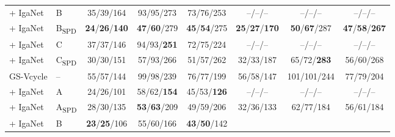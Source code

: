 \documentclass{article}
\theoremstyle{plain}
\numberwithin{equation}{section}
\begin{document}
\begin{table}[!ht]
\begin{tabular}{llcccccc}
        + IgaNet       & B                   & 35/39/164                           & 93/95/273                   & 73/76/253                            
                                             & --/--/--                            & --/--/--                    & --/--/--                             \\
        + IgaNet       & B\textsubscript{SPD}& \textbf{24}/\textbf{26}/\textbf{140}& \textbf{47}/\textbf{60}/279 & \textbf{45}/\textbf{54}/275                            
                                             & \textbf{25}/\textbf{27}/\textbf{170}& \textbf{50}/\textbf{67}/287          & \textbf{47}/\textbf{58}/\textbf{267}           \\
        + IgaNet       & C                   & 37/37/146                           & 94/93/\textbf{251}          & 72/75/224                            
                                             & --/--/--                            & --/--/--                    & --/--/--                             \\
        + IgaNet       & C\textsubscript{SPD}& 30/30/151                           & 57/93/266                   & 51/57/262                            
                                             & 32/33/187                           & 65/72/\textbf{283}          & 56/60/268                             \\
        \midrule
        GS-Vcycle      & --                  & 55/57/144                           & 99/98/239                   & 76/77/199                           
                                             & 56/58/147                           & 101/101/244                 & 77/79/204                             \\
        + IgaNet       & A                   & 24/26/101                           & 58/62/\textbf{154}          & 45/53/\textbf{126}                            
                                             & --/--/--                            & --/--/--                    & --/--/--                             \\
        + IgaNet       & A\textsubscript{SPD}& 28/30/135                           & \textbf{53}/\textbf{63}/209 & 49/59/206                            
                                             & 32/36/133                           & 62/77/184                   & 56/61/184                             \\
        + IgaNet       & B                   & \textbf{23}/\textbf{25}/106         & 55/60/166                   & \textbf{43}/\textbf{50}/142

\end{tabular}
\end{table}
\end{document}
